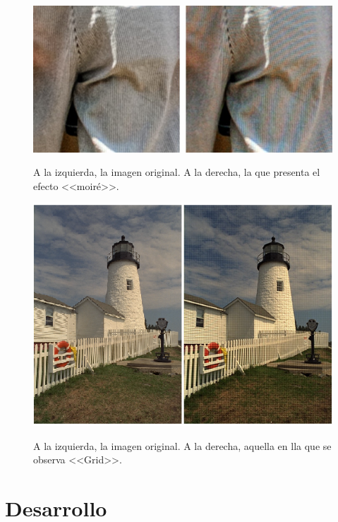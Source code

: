 \documentclass[a4paper]{article}
\begin{document}
\begin{figure}[h!]
	\caption{A la izquierda, la imagen original. A la derecha, la que presenta el efecto <<moiré>>.}
	\begin{center}
	\includegraphics[scale=0.50]{imagenes/moire}
	\label{moire}
  \end{center}
\end{figure}

\begin{figure}[h!]
	\caption{A la izquierda, la imagen original. A la derecha, aquella en lla que se observa <<Grid>>.}
	\begin{center}
	\includegraphics[scale=0.66]{imagenes/grid}
	\label{grid}
  \end{center}
\end{figure}


\newpage
\section{Desarrollo}
\end{document}
